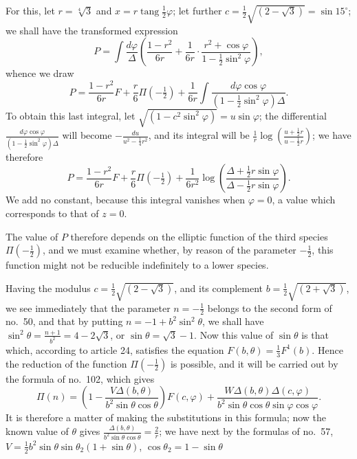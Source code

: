 \documentclass{article}
\begin{document}
For this, let $r=\sqrt[4]{3}$ and $x=r\operatorname{tang}\frac{1}{2}\varphi$; let further $c=\frac{1}{2}\sqrt{(2-\sqrt{3})}=\sin 15^{\circ}$; we shall have the transformed expression
\[ P=\int\frac{d\varphi}{\Delta}\left(\frac{1-r^{2}}{6r}+\frac{1}{6r}\cdot\frac{r^{2}+\cos\varphi}{1-\tfrac{1}{2}\sin^{2}\varphi}\right), \]
whence we draw
\[ P=\frac{1-r^{2}}{6r}F+\frac{r}{6}\Pi(-\tfrac{1}{2})+\frac{1}{6r}\int\frac{d\varphi\cos\varphi}{(1-\tfrac{1}{2}\sin^{2}\varphi)\Delta}. \]
To obtain this last integral, let $\sqrt{(1-c^{2}\sin^{2}\varphi)}=u\sin\varphi$; the differential $\frac{d\varphi\cos\varphi}{(1-\frac{1}{2}\sin^{2}\varphi)\Delta}$ will become $-\frac{du}{u^{2}-\frac{1}{4}r^{2}}$, and its integral will be $\frac{1}{r}\log\left(\frac{u+\frac{1}{2}r}{u-\frac{1}{2}r}\right)$; we have therefore
\[ P=\frac{1-r^{2}}{6r}F+\frac{r}{6}\Pi(-\tfrac{1}{2})+\frac{1}{6r^{2}}\log\left(\frac{\Delta+\frac{1}{2}r\sin\varphi}{\Delta-\frac{1}{2}r\sin\varphi}\right). \]
We add no constant, because this integral vanishes when $\varphi=0$, a value which corresponds to that of $z=0$.

The value of $P$ therefore depends on the elliptic function of the third species $\Pi(-\frac{1}{2})$, and we must examine whether, by reason of the parameter $-\frac{1}{2}$, this function might not be reducible indefinitely to a lower species.

Having the modulus $c=\frac{1}{2}\sqrt{(2-\sqrt{3})}$, and its complement $b=\frac{1}{2}\sqrt{(2+\sqrt{3})}$, we see immediately that the parameter $n=-\frac{1}{2}$ belongs to the second form of no.~50, and that by putting $n=-1+b^{2}\sin^{2}\theta$, we shall have $\sin^{2}\theta=\frac{n+1}{b^{2}}=4-2\sqrt{3}$, or $\sin\theta=\sqrt{3}-1$. Now this value of $\sin\theta$ is that which, according to article 24, satisfies the equation $F(b,\theta)=\frac{1}{3}F^{1}(b)$. Hence the reduction of the function $\Pi(-\frac{1}{2})$ is possible, and it will be carried out by the formula of no.~102, which gives
\[ \Pi(n)=\left(1-\frac{V\Delta(b,\theta)}{b^{2}\sin\theta\cos\theta}\right)F(c,\varphi)+\frac{W\Delta(b,\theta)\Delta(c,\varphi)}{b^{2}\sin\theta\cos\theta\sin\varphi\cos\varphi}. \]
It is therefore a matter of making the substitutions in this formula; now the known value of $\theta$ gives $\frac{\Delta(b,\theta)}{b^{2}\sin\theta\cos\theta}=\frac{2}{r}$; we have next by the formulas of no.~57, $V=\frac{1}{2}b^{2}\sin\theta\sin\theta_{2}(1+\sin\theta)$, $\cos\theta_{2}=1-\sin\theta$
\end{document}
